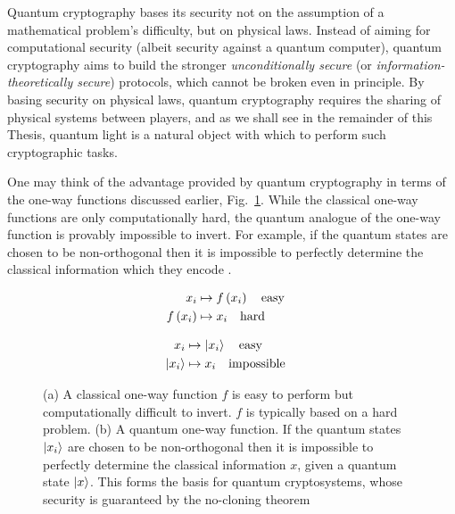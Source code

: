 Quantum cryptography bases its security not on the assumption of a mathematical problem's difficulty, but on physical laws. Instead of aiming for computational security (albeit security against a quantum computer), quantum cryptography aims to build the stronger \emph{unconditionally secure} (or \emph{information-theoretically secure}) protocols, which cannot be broken even in principle. By basing security on physical laws, quantum cryptography requires the sharing of physical systems between players, and as we shall see in the remainder of this Thesis, quantum light is a natural object with which to perform such cryptographic tasks. 

One may think of the advantage provided by quantum cryptography in terms of the one-way functions discussed earlier, Fig.~\ref{fig:qutrapdoor}. While the classical one-way functions are only computationally hard, the quantum analogue of the one-way function is provably impossible to invert. For example, if the quantum states are chosen to be non-orthogonal then it is impossible to perfectly determine the classical information which they encode \cite{Nielsen2010, brendon_book}.

\begin{figure}[h!]
\centering
\captionsetup{width=0.8\linewidth}
\begin{framed}
\begin{subfigure}{0.49\linewidth}
\begin{align*}
x_i &\mapsto f\left(x_i\right) \qq{easy} \\
f\left(x_i\right) &\mapsto x_i \qq{hard}
\end{align*}
\caption{}
\end{subfigure}
\begin{subfigure}{0.49\linewidth}
\begin{align*}
x_i &\mapsto \ket{x_i} \qq{easy}\\
\ket{x_i} &\mapsto x_i \qq{impossible}
\end{align*}
\caption{}
\end{subfigure}
\caption{(a) A classical one-way function $f$ is easy to perform but computationally difficult to invert. $f$ is typically based on a hard problem. (b) A quantum one-way function. If the quantum states $\ket{x_i}$ are chosen to be non-orthogonal then it is impossible to perfectly determine the classical information $x$, given a quantum state $\ket{x}$. This forms the basis for quantum cryptosystems, whose security is guaranteed by the no-cloning theorem \cite{Nielsen2010, brendon_book}}
\label{fig:qutrapdoor}
\end{framed}
\end{figure}








